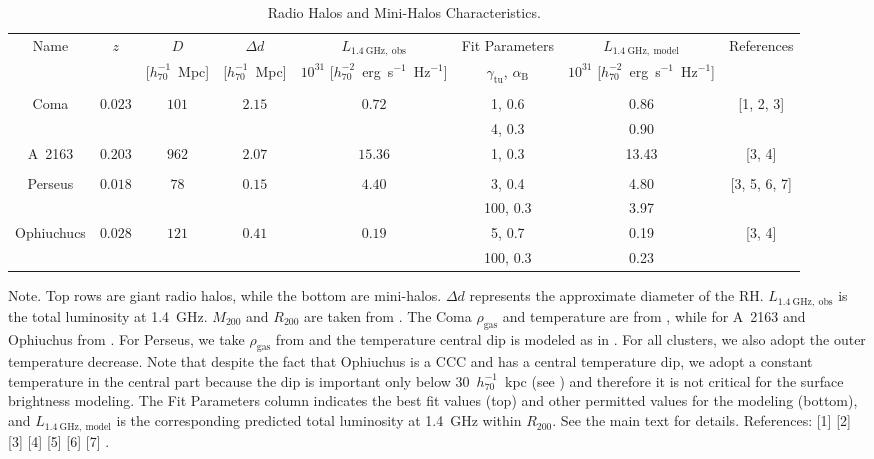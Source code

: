 \documentclass[traditabstract]{aa}
\newcommand{\rmn}{\mathrm}
\begin{document}
\begin{table}[t]
\begin{center}
\caption{Radio Halos and Mini-Halos Characteristics.}
\medskip
\begin{tabular}{cccccccc}
\hline
\phantom{\Big|}
Name & $z$ & $D$ & $\Delta d$ & $L_{1.4~\rmn{GHz},~\rmn{obs}}$ & Fit Parameters & $L_{1.4~\rmn{GHz},~\rmn{model}}$ & References \\
\phantom{\Big|}
           &   & [$h_{70}^{-1}$~Mpc] & [$h_{70}^{-1}$~Mpc] & $10^{31}$ [$h_{70}^{-2}$~erg~s$^{-1}$~Hz$^{-1}$] & $\gamma_{\rmn{tu}}$, $\alpha_{\rmn{B}}$ & $10^{31}$ [$h_{70}^{-2}$~erg~s$^{-1}$~Hz$^{-1}$] & \\
\hline \\[-0.5em]
Coma           & $0.023$ & $101$ & $2.15$ & $0.72$  & 1, 0.6  & 0.86 &  [1, 2, 3]   \\
               &         &       &        &                        & 4, 0.3  & 0.90  &  \\
A~2163         & $0.203$ & $962$ & $2.07$ & $15.36$     & 1, 0.3  & 13.43  &  [3, 4]  \\
\hline \\[-0.5em]
Perseus        & $0.018$ & $78$   & $0.15$ & $4.40$ & 3, 0.4   & 4.80 &  [3, 5, 6, 7]  \\
               &         &        &        &                       & 100, 0.3 & 3.97 &  \\
Ophiuchucs     & $0.028$ & $121$  & $0.41$ & $0.19$       & 5, 0.7   & 0.19  &  [3, 4] \\
               &         &        &        &                       & 100, 0.3 & 0.23 &   \\[0.5em]
\hline
\end{tabular}
\label{tab:RadioHalos}
\end{center}
\footnotesize{Note. Top rows are giant radio halos, while the bottom are mini-halos. $\Delta d$ represents the approximate diameter of the RH. $L_{1.4~\rmn{GHz},~\rmn{obs}}$ is the total luminosity at 1.4~GHz. $M_{200}$ and $R_{200}$ are taken from \cite{2002ApJ...567..716R}. The Coma $\rho_{\rmn{gas}}$ and temperature are from \cite{1992A&A...259L..31B}, while for A~2163 and Ophiuchus from \cite{2002ApJ...567..716R}. For Perseus, we take $\rho_{\rmn{gas}}$ from \cite{2003ApJ...590..225C} and the temperature central dip is modeled as in \cite{2004A&A...413...17P}. For all clusters, we also adopt the outer temperature decrease. Note that despite the fact that Ophiuchus is a CCC and has a central temperature dip, we adopt a constant temperature in the central part because the dip is important only below $30$~$h_{70}^{-1}$~kpc (see \citealp{2010MNRAS.405.1624M}) and therefore it is not critical for the surface brightness modeling. The Fit Parameters column indicates the best fit values (top) and other permitted values for the modeling (bottom), and $L_{1.4~\rmn{GHz},~\rmn{model}}$ is the corresponding predicted total luminosity at 1.4~GHz within $R_{200}$. See the main text for details. References: [1] \cite{1997A&A...321...55D} [2] \cite{1992A&A...259L..31B} [3] \cite{2002ApJ...567..716R} [4] \cite{2009A&A...499..679M} [5] \cite{1990MNRAS.246..477P} [6] \cite{2003ApJ...590..225C} [7] \cite{2004A&A...413...17P}.}

\end{table}
\end{document}
